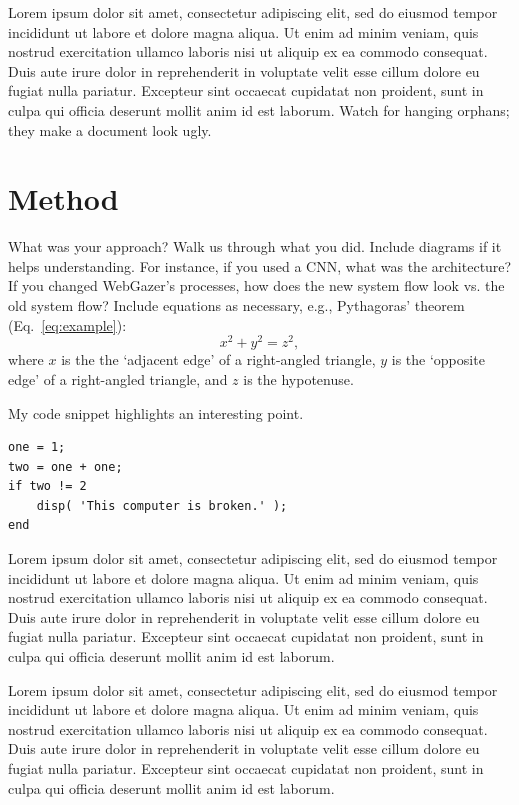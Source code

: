 \documentclass[10pt,twocolumn,letterpaper]{article}
\begin{document}
Lorem ipsum dolor sit amet, consectetur adipiscing elit, sed do eiusmod tempor incididunt ut labore et dolore magna aliqua. Ut enim ad minim veniam, quis nostrud exercitation ullamco laboris nisi ut aliquip ex ea commodo consequat. Duis aute irure dolor in reprehenderit in voluptate velit esse cillum dolore eu fugiat nulla pariatur. Excepteur sint occaecat cupidatat non proident, sunt in culpa qui officia deserunt mollit anim id est laborum. Watch for hanging orphans; they make a document look ugly.

\section{Method}

What was your approach? Walk us through what you did. Include diagrams if it helps understanding. For instance, if you used a CNN, what was the architecture? If you changed WebGazer's processes, how does the new system flow look vs. the old system flow? Include equations as necessary, e.g., Pythagoras' theorem (Eq.~\ref{eq:example}):
\begin{equation}
x^2 + y^2 = z^2,
\label{eq:example}
\end{equation}
where $x$ is the the `adjacent edge' of a right-angled triangle, $y$ is the `opposite edge' of a right-angled triangle, and $z$ is the hypotenuse.

My code snippet highlights an interesting point.
\begin{lstlisting}[style=Matlab-editor]
one = 1;
two = one + one;
if two != 2
    disp( 'This computer is broken.' );
end
\end{lstlisting}

Lorem ipsum dolor sit amet, consectetur adipiscing elit, sed do eiusmod tempor incididunt ut labore et dolore magna aliqua. Ut enim ad minim veniam, quis nostrud exercitation ullamco laboris nisi ut aliquip ex ea commodo consequat. Duis aute irure dolor in reprehenderit in voluptate velit esse cillum dolore eu fugiat nulla pariatur. Excepteur sint occaecat cupidatat non proident, sunt in culpa qui officia deserunt mollit anim id est laborum.

Lorem ipsum dolor sit amet, consectetur adipiscing elit, sed do eiusmod tempor incididunt ut labore et dolore magna aliqua. Ut enim ad minim veniam, quis nostrud exercitation ullamco laboris nisi ut aliquip ex ea commodo consequat. Duis aute irure dolor in reprehenderit in voluptate velit esse cillum dolore eu fugiat nulla pariatur. Excepteur sint occaecat cupidatat non proident, sunt in culpa qui officia deserunt mollit anim id est laborum.
\end{document}
